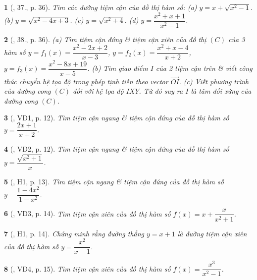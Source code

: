 \documentclass{article}
\newtheorem{baitoan}{}
\begin{document}
\begin{baitoan}[\cite{SGK_Toan_12_giai_tich_nang_cao}, 37., p. 36]
	Tìm các đường tiệm cận của đồ thị hàm số: (a) $y = x + \sqrt{x^2 - 1}$. (b) $y = \sqrt{x^2 - 4x + 3}$. (c) $y = \sqrt{x^2 + 4}$. (d) $y = \dfrac{x^2 + x + 1}{x^2 - 1}$.
\end{baitoan}

\begin{baitoan}[\cite{SGK_Toan_12_giai_tich_nang_cao}, 38., p. 36]
	(a) Tìm tiệm cận đứng \& tiệm cận xiên của đồ thị $(C)$ của 3 hàm số $y = f_1(x) = \dfrac{x^2 - 2x + 2}{x - 3}$, $y = f_2(x) = \dfrac{x^2 + x - 4}{x + 2}$, $y = f_3(x) = \dfrac{x^2 - 8x + 19}{x - 5}$. (b) Tìm giao điểm $I$ của 2 tiệm cận trên \& viết công thức chuyển hệ tọa độ trong phép tịnh tiến theo vector $\overrightarrow{OI}$. (c) Viết phương trình của đường cong $(C)$ đối với hệ tọa độ $IXY$. Từ đó suy ra $I$ là tâm đối xứng của đường cong $(C)$.
\end{baitoan}

\begin{baitoan}[\cite{TLCT_giai_tich_12}, VD1, p. 12]
	Tìm tiệm cận ngang \& tiệm cận đứng của đồ thị hàm số $y = \dfrac{2x + 1}{x + 2}$.
\end{baitoan}

\begin{baitoan}[\cite{TLCT_giai_tich_12}, VD2, p. 12]
	Tìm tiệm cận ngang \& tiệm cận đứng của đồ thị hàm số $y = \dfrac{\sqrt{x^2 + 1}}{x}$.
\end{baitoan}

\begin{baitoan}[\cite{TLCT_giai_tich_12}, H1, p. 13]
	Tìm tiệm cận ngang \& tiệm cận đứng của đồ thị hàm số $y = \dfrac{1 - 4x^2}{1 - x^2}$.
\end{baitoan}

\begin{baitoan}[\cite{TLCT_giai_tich_12}, VD3, p. 14]
	Tìm tiệm cận xiên của đồ thị hàm số $f(x) = x + \dfrac{x}{x^2 + 1}$.
\end{baitoan}

\begin{baitoan}[\cite{TLCT_giai_tich_12}, H1, p. 14]
	Chứng minh rằng đường thẳng $y = x + 1$ là đường tiệm cận xiên của đồ thị hàm số $y = \dfrac{x^2}{x - 1}$.
\end{baitoan}

\begin{baitoan}[\cite{TLCT_giai_tich_12}, VD4, p. 15]
	Tìm tiệm cận xiên của đồ thị hàm số $f(x) = \dfrac{x^3}{x^2 - 1}$.
\end{baitoan}
\end{document}
